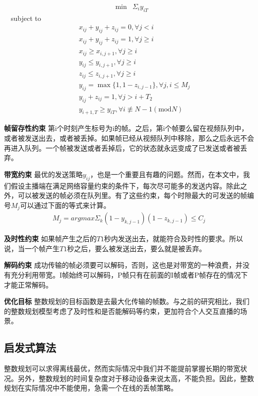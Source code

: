 \begin{eqnarray}
&\min & \Sigma_i {y_{iT}} \nonumber
\label{obj}
\end{eqnarray}
\ \ subject to
\vspace{-0.2in}
\begin{eqnarray}
  && x_{ij}+y_{ij}+z_{ij} = 0, \forall j<i \\
  && x_{ij}+y_{ij}+z_{ij} = 1, \forall j\geq i \\
  && x_{ij} \geq x_{i,j+1}, \forall j\geq i \\
  && y_{ij} \leq y_{i,j+1}, \forall j\geq i \\
  && z_{ij} \leq z_{i,j+1}, \forall j\geq i \\
  && y_{ij} = \max\{1,{1-z_{i,j-1}}\}, \forall j, i \leq M_{j} \\
  && y_{ij}+z_{ij} = 1 ,\forall j>i+T_2 \\
  && y_{i+1,T} \geq y_{iT}, \forall i \not\equiv N-1 (\text{mod}N)
\end{eqnarray}

\textbf{帧留存性约束} 第i个时刻产生标号为i的帧。之后，第i个帧要么留在视频队列中，或者被发送出去，或者被丢掉。如果帧已经从视频队列中移除，那么之后永远不会再进入队列。一个帧被发送或者丢掉后，它的状态就永远变成了已发送或者被丢弃。

\textbf{带宽约束} 最优的发送策略$y_{ij}$，也是一个重要且有趣的问题。然而，在本文中，我们假设主播端在满足网络容量约束的条件下，每次尽可能多的发送内容。除此之外，可以被发送的帧必须在队列里。有了这些约束，每个时隙最大的可发送的帧编号$M_j$可以通过下面的等式来计算。
\begin{align}
M_j = argmax \Sigma_k (1-y_{k,j-1})(1-z_{k,j-1}) \leq C_{j}
\end{align}

\textbf{及时性约束} 如果帧产生之后的$T1$秒内发送出去，就能符合及时性的要求。所以说，当一个帧产生$T1$秒之后，要么被发送出去，要么就是被丢弃。

\textbf{解码约束} 成功传输的帧必须要可以解码，否则，这也是对带宽的一种浪费，并没有充分利用带宽。I帧始终可以解码，P帧只有在前面的I帧或者P帧存在的情况下才能正常解码。

\textbf{优化目标} 整数规划的目标函数是去最大化传输的帧数。与之前的研究相比，我们的整数规划模型考虑了及时性和是否能解码等约束，更加符合个人交互直播的场景。

\subsection{启发式算法}
整数规划可以求得离线最优，然而实际情况中我们并不能提前掌握长期的带宽状况。另外，整数规划的时间复杂度对于移动设备来说太高，不能负担。因此，整数规划在实际情况中不能使用，急需一个在线的丢帧策略。

